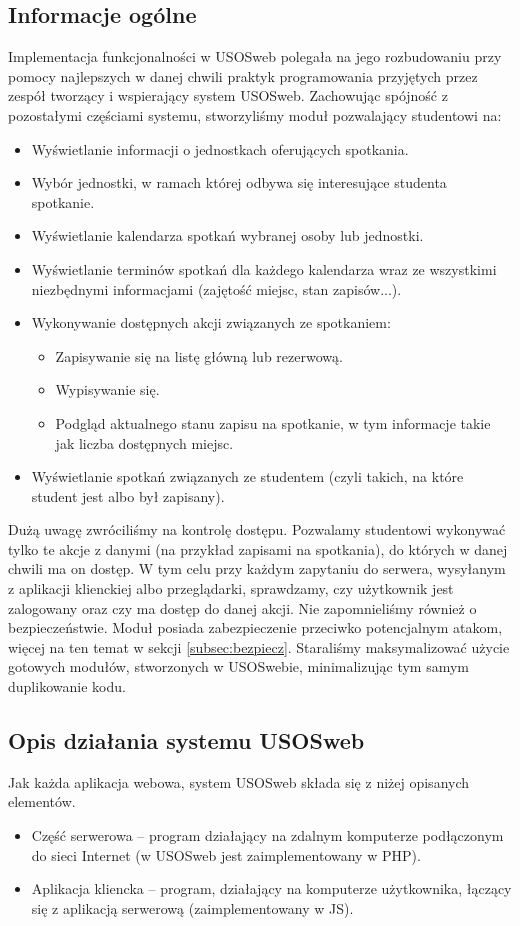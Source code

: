 \documentclass[licencjacka]{pracamgr}
\begin{document}
\subsection{Informacje ogólne}
Implementacja funkcjonalności w USOSweb polegała na jego rozbudowaniu przy pomocy najlepszych w danej chwili praktyk programowania przyjętych przez zespół tworzący i wspierający system USOSweb. Zachowując spójność z pozostałymi częściami systemu, stworzyliśmy moduł pozwalający studentowi na:
\begin{itemize}
  \item{Wyświetlanie informacji o jednostkach oferujących spotkania.}
  \item{Wybór jednostki, w ramach której odbywa się interesujące studenta spotkanie.}
  \item{Wyświetlanie kalendarza spotkań wybranej osoby lub jednostki.}
  \item{Wyświetlanie terminów spotkań dla każdego kalendarza wraz ze wszystkimi niezbędnymi informacjami (zajętość miejsc, stan zapisów...).}
  \item{Wykonywanie dostępnych akcji związanych ze spotkaniem:
  \begin{itemize}
    \item{Zapisywanie się na listę główną lub rezerwową.}
    \item{Wypisywanie się.}
    \item{Podgląd aktualnego stanu zapisu na spotkanie, w tym informacje takie jak liczba dostępnych miejsc.}
  \end{itemize}
}
\item{Wyświetlanie spotkań związanych ze studentem (czyli takich, na które student jest albo był zapisany).}
\end{itemize}

Dużą uwagę zwróciliśmy na kontrolę dostępu. Pozwalamy studentowi wykonywać tylko te akcje z danymi (na przykład zapisami na spotkania), do których w danej chwili ma on dostęp. W tym celu przy każdym zapytaniu do serwera, wysyłanym z aplikacji klienckiej albo przeglądarki, sprawdzamy, czy użytkownik jest zalogowany oraz czy ma dostęp do danej akcji. Nie zapomnieliśmy również o bezpieczeństwie. Moduł posiada zabezpieczenie przeciwko potencjalnym atakom, więcej na ten temat w sekcji \ref{subsec:bezpiecz}. Staraliśmy maksymalizować użycie gotowych modułów, stworzonych w USOSwebie, minimalizując tym samym duplikowanie kodu.

\subsection{Opis działania systemu USOSweb}
Jak każda aplikacja webowa, system USOSweb składa się z niżej opisanych elementów.
\begin{itemize}
  \item
  Część serwerowa -- program działający na zdalnym komputerze podłączonym do sieci Internet (w USOSweb jest zaimplementowany w PHP).
  \item
  Aplikacja kliencka -- program, działający na komputerze użytkownika, łączący się z aplikacją serwerową (zaimplementowany w JS).
\end{itemize}
\end{document}
